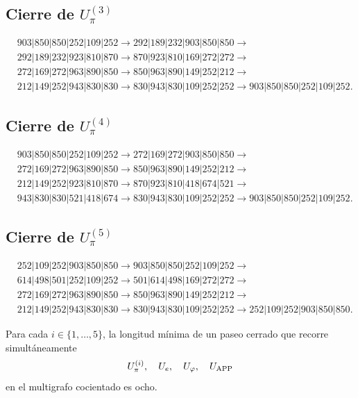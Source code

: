 \subsection{Cierre de \texorpdfstring{\(U_\pi^{(3)}\)}{U-pi 3}}
\begin{align*}
&903|850|850|252|109|252\to
292|189|232|903|850|850\to\\
&292|189|232|923|810|870\to
870|923|810|169|272|272\to\\
&272|169|272|963|890|850\to
850|963|890|149|252|212\to\\
&212|149|252|943|830|830\to
830|943|830|109|252|252\to
903|850|850|252|109|252.
\end{align*}

\subsection{Cierre de \texorpdfstring{\(U_\pi^{(4)}\)}{U-pi 4}}
\begin{align*}
&903|850|850|252|109|252\to
272|169|272|903|850|850\to\\
&272|169|272|963|890|850\to
850|963|890|149|252|212\to\\
&212|149|252|923|810|870\to
870|923|810|418|674|521\to\\
&943|830|830|521|418|674\to
830|943|830|109|252|252\to
903|850|850|252|109|252.
\end{align*}

\subsection{Cierre de \texorpdfstring{\(U_\pi^{(5)}\)}{U-pi 5}}
\begin{align*}
&252|109|252|903|850|850\to
903|850|850|252|109|252\to\\
&614|498|501|252|109|252\to
501|614|498|169|272|272\to\\
&272|169|272|963|890|850\to
850|963|890|149|252|212\to\\
&212|149|252|943|830|830\to
830|943|830|109|252|252\to
252|109|252|903|850|850.
\end{align*}

\begin{theorem}
\label{gfp:b:thm:minimalidad-cierres-pi-autonoma}
Para cada \(i\in\{1,\ldots,5\}\), la longitud mínima de un paseo cerrado
que recorre simultáneamente
\[
 U_\pi^{(i)},\quad U_e,\quad U_\varphi,\quad U_{\rm APP}
\]
en el multigrafo cocientado es ocho.
\end{theorem}

